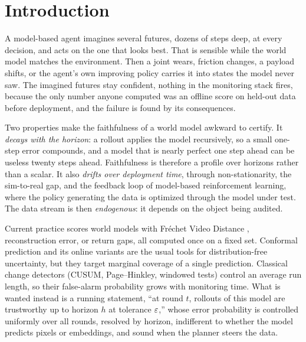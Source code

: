 \section{Introduction}\label{sec:intro}

A model-based agent imagines several futures, dozens of steps deep, at every decision, and acts on
the one that looks best. That is sensible while the world model matches the environment. Then a
joint wears, friction changes, a payload shifts, or the agent's own improving policy carries it into
states the model never saw. The imagined futures stay confident, nothing in the monitoring stack
fires, because the only number anyone computed was an offline score on held-out data before
deployment, and the failure is found by its consequences.

Two properties make the faithfulness of a world model awkward to certify. It \emph{decays with the
horizon}: a rollout applies the model recursively, so a small one-step error compounds, and a model
that is nearly perfect one step ahead can be useless twenty steps ahead. Faithfulness is therefore a
profile over horizons rather than a scalar. It also \emph{drifts over deployment time}, through
non-stationarity, the sim-to-real gap, and the feedback loop of model-based reinforcement learning,
where the policy generating the data is optimized through the model under test. The data stream
is then \emph{endogenous}: it depends on the object being audited.

Current practice scores world models with Fr\'echet Video Distance \citep{unterthiner2018fvd},
reconstruction error, or return gaps, all computed once on a fixed set. Conformal prediction
\citep{vovk2005algorithmic} and its online variants \citep{gibbs2021adaptive,gibbs2024conformal}
are the usual tools for distribution-free uncertainty, but they target marginal coverage of a single
prediction. Classical change detectors (CUSUM, Page--Hinkley, windowed tests) control an average run
length, so their false-alarm probability grows with monitoring time. What is wanted instead is a
running statement, ``at round $t$, rollouts of this model are trustworthy up to horizon $h$ at
tolerance $\varepsilon$,'' whose error probability is controlled uniformly over all rounds, resolved by
horizon, indifferent to whether the model predicts pixels or embeddings, and sound when the planner
steers the data.

